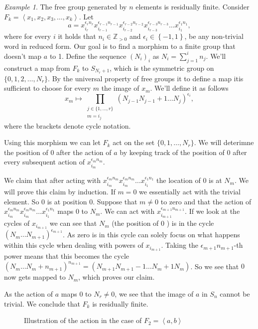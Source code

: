 \documentclass[titlepage, a4paper]{article}
\newcommand{\Z}{\mathbb{Z}}
\theoremstyle{remark}
\newtheorem{example}[theorem]{Example}
\begin{document}
\begin{example}
	The free group generated by $n$ elements is residually finite. 
	Consider $F_k = \left<x_1, x_2, x_3, \ldots, x_k \right>$.
Let \[
a = x_{i_r}^{\epsilon_r n_r}x_{i_{r-1}}^{\epsilon_{r-1}n_{r-1}}x_{i_{r-2}}^{\epsilon_{r-2}n_{r-2}}x_{i_{r-3}}^{\epsilon_{r-3}n_{r-3}} \ldots x_{i_1}^{\epsilon_1n_1}
,\]
where for every $i$ it holds that $n_i \in \Z_{>0}$ and $\epsilon_i \in \left\{ -1,1 \right\} $, be any non-trivial word in reduced form. 
Our goal is to find a morphism to a finite group that doesn't map $a$ to 1. 
Define the sequence $(N_i)_i$ as $N_i = \sum_{j = 1}^{i} n_j$. 
We'll construct a map from $F_k$ to $S_{N_r + 1}$, which is the symmetric group on $\{0,1, 2, \ldots, N_{r}\} $.
By the universal property of free groups it to define a map itis sufficient to choose for every $m$ the image of $x_m$.
We'll define it as follows
\[
x_m \mapsto \prod_{\substack{j \in \{1,\ldots, r\} \\ m = i_j} } (N_{j-1} N_{j-1}+1 \ldots N_{j})^{\epsilon_i}
,\] 
where the brackets denote cycle notation.

Using this morphism we can let $F_k$ act on the set $\{0,1,\ldots, N_r\} $. 
We will deterimne the position of $0$ after the action of $a$ by keeping track of the position of $0$ after every subsequent  action of  $x_{i_m}^{\epsilon_m n_m}$.

We claim that after acting with $x_{i_{m}}^{\epsilon_{m}n_{m}}x_{i_{m}}^{\epsilon_{m}n_{m}} \ldots x_{i_1}^{\epsilon_1n_1}$ the location of  $0$ is at $N_m$.
We will prove this claim by induction.
If  $m=0$ we essentially act with the trivial element. So $0$ is at position $0$.
 Suppose that $m \ne 0$ to zero and that the action of $x_{i_{m}}^{\epsilon_{m}n_{m}}x_{i_{m}}^{\epsilon_{m}n_{m}} \ldots x_{i_1}^{\epsilon_1n_1}$ maps $0$ to $N_m$. 
 We can act with  $x_{i_{m+1}}^{\epsilon_{m+1}n_{m+1}}$. 
 If we look at the cycles of $x_{i_{m+1}}$ we can see that $N_m$ (the position of  $0$ ) is in the cycle $(N_m \ldots N_{m+1})^{\epsilon_{m+1}}$. As zero is in this cycle can solely focus on what happens within this cycle when dealing with powers of $x_{i_{m+1}}$. 
 Taking the $\epsilon _{m+1} n_{m+1}$-th power means that this becomes the cycle $(N_m \ldots N_{m} + n_{m+1})^{n_{m+1}} = (N_{m+1} N_{m+1}-1 \ldots N_m + 1 N_m)$. 
So we see that $0$ now gets mapped to $N_m$, which proves our claim.

As the action of  $a$ maps $0$ to $N_r \ne 0$, we see that the image of  $a$ in  $S_n$ cannot be trivial. 
We conclude that $F_k$ is residually finite.

\begin{figure}[ht]
	\centering
	
	\caption{Illustration of the action in the case of $F_2 = \left<a,b \right>$}
	\label{fig:}
\end{figure}

\end{example}
\end{document}
